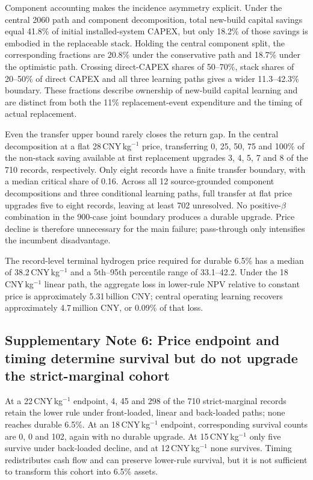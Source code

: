 \documentclass[pdflatex,sn-nature]{sn-jnl}
\begin{document}
Component accounting makes the incidence asymmetry explicit. Under the central 2060 path and component decomposition, total new-build capital savings equal 41.8\% of initial installed-system CAPEX, but only 18.2\% of those savings is embodied in the replaceable stack. Holding the central component split, the corresponding fractions are 20.8\% under the conservative path and 18.7\% under the optimistic path. Crossing direct-CAPEX shares of 50--70\%, stack shares of 20--50\% of direct CAPEX and all three learning paths gives a wider 11.3--42.3\% boundary. These fractions describe ownership of new-build capital learning and are distinct from both the 11\% replacement-event expenditure and the timing of actual replacement.

Even the transfer upper bound rarely closes the return gap. In the central decomposition at a flat 28\,CNY\,kg$^{-1}$ price, transferring 0, 25, 50, 75 and 100\% of the non-stack saving available at first replacement upgrades 3, 4, 5, 7 and 8 of the 710 records, respectively. Only eight records have a finite transfer boundary, with a median critical share of 0.16. Across all 12 source-grounded component decompositions and three conditional learning paths, full transfer at flat price upgrades five to eight records, leaving at least 702 unresolved. No positive-$\beta$ combination in the 900-case joint boundary produces a durable upgrade. Price decline is therefore unnecessary for the main failure; pass-through only intensifies the incumbent disadvantage.

The record-level terminal hydrogen price required for durable 6.5\% has a median of 38.2\,CNY\,kg$^{-1}$ and a 5th--95th percentile range of 33.1--42.2. Under the 18\,CNY\,kg$^{-1}$ linear path, the aggregate loss in lower-rule NPV relative to constant price is approximately 5.31\,billion CNY; central operating learning recovers approximately 4.7\,million CNY, or 0.09\% of that loss.

\subsection*{Supplementary Note 6: Price endpoint and timing determine survival but do not upgrade the strict-marginal cohort}

At a 22\,CNY\,kg$^{-1}$ endpoint, 4, 45 and 298 of the 710 strict-marginal records retain the lower rule under front-loaded, linear and back-loaded paths; none reaches durable 6.5\%. At an 18\,CNY\,kg$^{-1}$ endpoint, corresponding survival counts are 0, 0 and 102, again with no durable upgrade. At 15\,CNY\,kg$^{-1}$ only five survive under back-loaded decline, and at 12\,CNY\,kg$^{-1}$ none survives. Timing redistributes cash flow and can preserve lower-rule survival, but it is not sufficient to transform this cohort into 6.5\% assets.
\end{document}
